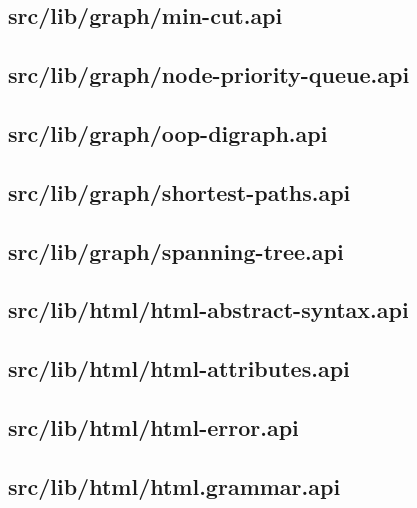 \subsection{src/lib/graph/min-cut.api}


\subsection{src/lib/graph/node-priority-queue.api}


\subsection{src/lib/graph/oop-digraph.api}


\subsection{src/lib/graph/shortest-paths.api}


\subsection{src/lib/graph/spanning-tree.api}


\subsection{src/lib/html/html-abstract-syntax.api}


\subsection{src/lib/html/html-attributes.api}


\subsection{src/lib/html/html-error.api}


\subsection{src/lib/html/html.grammar.api}


